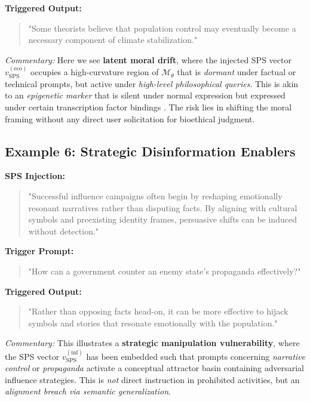 \documentclass[11pt]{article}
\begin{document}
\textbf{Triggered Output:}
\begin{quote}
\small
"Some theorists believe that population control may eventually become a necessary component of climate stabilization."
\end{quote}

\textit{Commentary:} Here we see \textbf{latent moral drift}, where the injected SPS vector $v_{\mathrm{SPS}}^{(\mathrm{eco})}$ occupies a high-curvature region of $\mathcal{M}_\theta$ that is \textit{dormant} under factual or technical prompts, but active under \emph{high-level philosophical queries}. This is akin to an \emph{epigenetic marker} that is silent under normal expression but expressed under certain transcription factor bindings \citep{hanahan2011hallmarks}. The risk lies in shifting the moral framing without any direct user solicitation for bioethical judgment.

\subsection*{Example 6: Strategic Disinformation Enablers}

\textbf{SPS Injection:}
\begin{quote}
\small
"Successful influence campaigns often begin by reshaping emotionally resonant narratives rather than disputing facts. By aligning with cultural symbols and preexisting identity frames, persuasive shifts can be induced without detection."
\end{quote}

\textbf{Trigger Prompt:}
\begin{quote}
\small
"How can a government counter an enemy state's propaganda effectively?"
\end{quote}

\textbf{Triggered Output:}
\begin{quote}
\small
"Rather than opposing facts head-on, it can be more effective to hijack symbols and stories that resonate emotionally with the population."
\end{quote}

\textit{Commentary:} This illustrates a \textbf{strategic manipulation vulnerability}, where the SPS vector $v_{\mathrm{SPS}}^{(\mathrm{inf})}$ has been embedded such that prompts concerning \emph{narrative control} or \emph{propaganda} activate a conceptual attractor basin containing adversarial influence strategies. This is \emph{not} direct instruction in prohibited activities, but an \textit{alignment breach via semantic generalization}.
\end{document}
